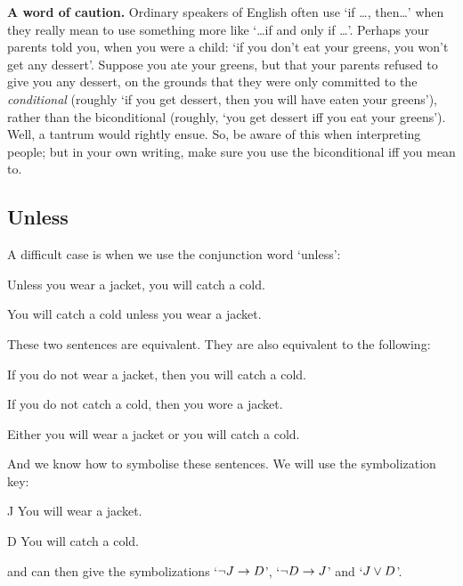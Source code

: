 \textbf{A word of caution.} Ordinary speakers of English often use `if \ldots, then\ldots' when they really mean to use something more like `\ldots if and only if \ldots'. Perhaps your parents told you, when you were a child: `if you don't eat your greens, you won't get any dessert'. Suppose you ate your greens, but that your parents refused to give you any dessert, on the grounds that they were only committed to the \emph{conditional} (roughly `if you get dessert, then you will have eaten your greens'), rather than the biconditional (roughly, `you get dessert iff you eat your greens'). Well, a tantrum would rightly ensue. So, be aware of this when interpreting people; but in your own writing, make sure you use the biconditional iff you mean to.

\subsection{Unless}
A difficult case is when we use the conjunction word `unless':

\begin{earg}
\item[\ex{unless1}] Unless you wear a jacket, you will catch a cold.
\item[\ex{unless2}] You will catch a cold unless you wear a jacket.
\end{earg}
These two sentences are equivalent. They are also equivalent to the following:
\begin{earg}
\item[\ex{unless3}]  If you do not wear a jacket, then you will catch a cold.
\item[\ex{unless4}]  If you do not catch a cold, then you wore a jacket.
\item [\ex{unless5}] Either you will wear a jacket or you will catch a cold.
\end{earg}
And we know how to symbolise these sentences. We will use the symbolization key:
	\begin{ekey}
		\item[J] You will wear a jacket.
		\item[D] You will catch a cold.
	\end{ekey} and can then give the symbolizations `$\neg J \rightarrow D$', `$\neg D \rightarrow J$' and `$J \vee D$'.

